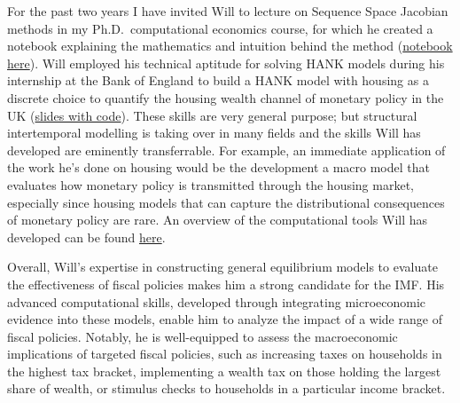 \documentclass[\econtexRoot/Letter]{subfiles}
\begin{document}
For the past two years I have invited Will to lecture on Sequence Space Jacobian methods in my Ph.D.\ computational economics course, for which he created a notebook explaining the mathematics and intuition behind the method (\href{https://github.com/econ-ark/HARK/blob/master/examples/ConsNewKeynesianModel/SSJ_explanation.ipynb}{notebook here}). Will employed his technical aptitude for solving HANK models during his internship at the Bank of England to build a HANK model with housing as a discrete choice to quantify the housing wealth channel of monetary policy in the UK (\href{https://github.com/wdu9/HANK_Housing_Block}{slides with code}). These skills are very general purpose; but structural intertemporal modelling is taking over in many fields and the skills Will has developed are eminently transferrable. For example, an immediate application of the work he's done on housing would be the development a macro model that evaluates how monetary policy is transmitted through the housing market, especially since housing models that can capture the distributional consequences of monetary policy are rare. An overview of the computational tools Will has developed can be found \href{https://www.william-du.com/computational-tools}{here}.

Overall, Will's expertise in constructing general equilibrium models to evaluate the effectiveness of fiscal policies makes him a strong candidate for the IMF. His advanced computational skills, developed through integrating microeconomic evidence into these models, enable him to analyze the impact of a wide range of fiscal policies. Notably, he is well-equipped to assess the macroeconomic implications of targeted fiscal policies, such as increasing taxes on households in the highest tax bracket, implementing a wealth tax on those holding the largest share of wealth, or stimulus checks to households in a particular income bracket.
\end{document}
